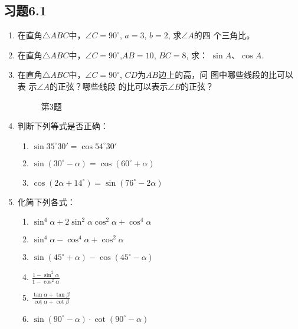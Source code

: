 \subsection*{习题6.1}
\begin{enumerate}
    \item 在直角$\triangle ABC$中，$\angle C=90^{\circ}$, $a=3$, $b=2$, 求$\angle A$的四
    个三角比。
    \item 在直角$\triangle ABC$中，$\angle C=90^{\circ}$,$\overline{AB}=10$, $\overline{BC}=8$, 求：
   $ \sin A$、$\cos A$.
    \item 在直角$\triangle ABC$中，$\angle C=90^{\circ}$, $\overline{CD}$为$\overline{AB}$边上的高，问
    图中哪些线段的比可以表
    示$\angle A$的正弦？哪些线段
    的比可以表示$\angle B$的正弦？
\begin{figure}[htp]
    \centering
    \caption*{第3题}
\end{figure}

    \item 判断下列等式是否正确：
\begin{enumerate}
\item $\sin35^{\circ} 30'=\cos54^{\circ} 30'$
\item $\sin(30^{\circ} -\alpha )=\cos(60^{\circ} +\alpha )$
\item $\cos(2\alpha +14^{\circ} )=\sin(76^{\circ} -2\alpha )$
\end{enumerate}

\item 化简下列各式：
\begin{enumerate}
\item $\sin^4\alpha  +2\sin^2\alpha \cos^2\alpha +\cos^4\alpha $
\item $\sin^4\alpha -\cos^4\alpha +\cos^2\alpha $
\item $\sin(45^{\circ} +\alpha )-\cos(45^{\circ} -\alpha )$    
\item $\frac{1-\sin^2\alpha }{1-\cos^2\alpha }$
\item $\frac{\tan \alpha +\tan \beta}{\cot\alpha +\cot \beta}$
\item $\sin(90^{\circ} -\alpha )\cdot \cot(90^{\circ} -\alpha )$
\end{enumerate}


\end{enumerate}
